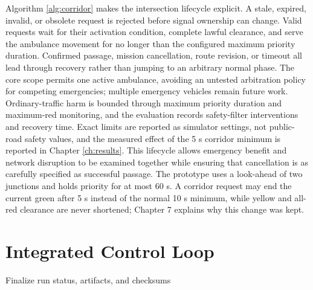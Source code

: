 Algorithm \ref{alg:corridor} makes the intersection lifecycle explicit. A stale, expired, invalid, or obsolete request is rejected before signal ownership can change. Valid requests wait for their activation condition, complete lawful clearance, and serve the ambulance movement for no longer than the configured maximum priority duration. Confirmed passage, mission cancellation, route revision, or timeout all lead through recovery rather than jumping to an arbitrary normal phase. The core scope permits one active ambulance, avoiding an untested arbitration policy for competing emergencies; multiple emergency vehicles remain future work. Ordinary-traffic harm is bounded through maximum priority duration and maximum-red monitoring, and the evaluation records safety-filter interventions and recovery time. Exact limits are reported as simulator settings, not public-road safety values, and the measured effect of the 5 s corridor minimum is reported in Chapter \ref{ch:results}. This lifecycle allows emergency benefit and network disruption to be examined together while ensuring that cancellation is as carefully specified as successful passage. The prototype uses a look-ahead of two junctions and holds priority for at most 60 s. A corridor request may end the current green after 5 s instead of the normal 10 s minimum, while yellow and all-red clearance are never shortened; Chapter 7 explains why this change was kept.


\section{Integrated Control Loop}

\begin{algorithm}[H]
\caption{Single-owner simulation and decision loop}
\label{alg:loop}
Finalize run status, artifacts, and checksums\;
\end{algorithm}

